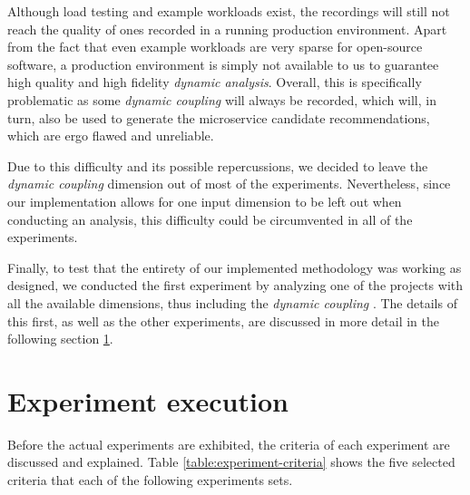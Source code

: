\documentclass[12pt,a4paper]{report}
\begin{document}
Although load testing and example workloads exist, the recordings will still
not reach the quality of ones recorded in a running production environment.
Apart from the fact that even example workloads are very sparse for open-source
software, a production environment is simply not available to us to guarantee
high quality and high fidelity \textit{dynamic analysis}. Overall, this is
specifically problematic as some \textit{dynamic coupling} will always be
recorded, which will, in turn, also be used to generate the microservice
candidate recommendations, which are ergo flawed and unreliable.

Due to this difficulty and its possible repercussions, we decided to leave the
\textit{dynamic coupling} dimension out of most of the experiments.
Nevertheless, since our implementation allows for one input dimension to be
left out when conducting an analysis, this difficulty could be circumvented in
all of the experiments.

Finally, to test that the entirety of our implemented methodology was working
as designed, we conducted the first experiment by analyzing one of the projects
with all the available dimensions, thus including the \textit{dynamic coupling}
. The details of this first, as well as the other experiments, are discussed in
more detail in the following section \ref{sect:experiment-execution}.



\section{Experiment execution} \label{sect:experiment-execution}

Before the actual experiments are exhibited, the criteria of each experiment
are discussed and explained. Table \ref{table:experiment-criteria} shows the
five selected criteria that each of the following experiments sets.
\end{document}
